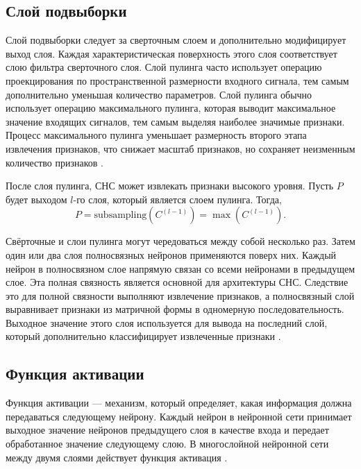 \subsection{Слой подвыборки}
	Слой подвыборки следует за сверточным слоем и дополнительно модифицирует выход слоя. Каждая характеристическая поверхность этого слоя соответствует слою фильтра сверточного слоя. Слой пулинга часто использует операцию проекцирования по пространственной размерности входного сигнала, тем самым дополнительно уменьшая количество параметров. Слой пулинга обычно использует операцию максимального пулинга, которая выводит максимальное значение входящих сигналов, тем самым выделяя наиболее значимые признаки. Процесс максимального пулинга уменьшает размерность второго этапа извлечения признаков, что снижает масштаб признаков, но сохраняет неизменным количество признаков \cite{lightweight}.
	
	После слоя пулинга, СНС может извлекать признаки высокого уровня. Пусть \( P \) будет выходом \( l \)-го слоя, который является слоем пулинга. Тогда,
	\begin{equation}
		P = \text{subsampling}(C^{(l-1)}) = \max(C^{(l-1)}).
	\end{equation}
	
	Свёрточные и слои пулинга могут чередоваться между собой несколько раз. Затем один или два слоя полносвязных нейронов применяются поверх них. Каждый нейрон в полносвязном слое напрямую связан со всеми нейронами в предыдущем слое. Эта полная связность является основной для архитектуры СНС. Следствие это для полной связности выполняют извлечение признаков, а полносвязный слой выравнивает признаки из матричной формы в одномерную последовательность. Выходное значение этого слоя используется для вывода на последний слой, который дополнительно классифицирует извлеченные признаки \cite{lightweight}.
	
\subsection{Функция активации}
	Функция активации --- механизм, который определяет, какая информация должна передаваться следующему нейрону. Каждый нейрон в нейронной сети принимает выходное значение нейронов предыдущего слоя в качестве входа и передает обработанное значение следующему слою. В многослойной нейронной сети между двумя слоями действует функция активация \cite{survey}.
	
	
